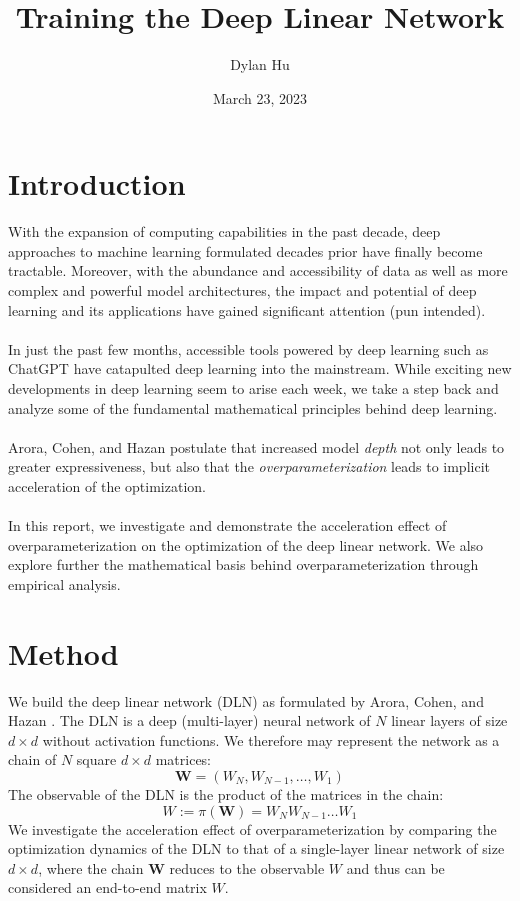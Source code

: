 \documentclass[11pt]{article}
\title{Training the Deep Linear Network}
\author{Dylan Hu}
\date{March 23, 2023}
\begin{document}
\maketitle
{
  \hypersetup{linkcolor=black}
  \tableofcontents
}
\section{Introduction}
With the expansion of computing capabilities in the past decade, deep approaches to machine learning formulated decades prior have finally become tractable. Moreover, with the abundance and accessibility of data as well as more complex and powerful model architectures, the impact and potential of deep learning and its applications have gained significant attention (pun intended).
\\\\
In just the past few months, accessible tools powered by deep learning such as ChatGPT have catapulted deep learning into the mainstream. While exciting new developments in deep learning seem to arise each week, we take a step back and analyze some of the fundamental mathematical principles behind deep learning.
\\\\
Arora, Cohen, and Hazan \cite{arora2018optimization} postulate that increased model \textit{depth} not only leads to greater expressiveness, but also that the \textit{overparameterization} leads to implicit acceleration of the optimization.
\\\\
In this report, we investigate and demonstrate the acceleration effect of overparameterization on the optimization of the deep linear network. We also explore further the mathematical basis behind overparameterization through empirical analysis.

\pagebreak

\section{Method}
We build the deep linear network (DLN) as formulated by Arora, Cohen, and Hazan \cite{arora2018optimization}. The DLN is a deep (multi-layer) neural network of $N$ linear layers of size $d \times d$ without activation functions. We therefore may represent the network as a chain of $N$ square $d \times d$ matrices:
$$\bm{W} = \left(W_N, W_{N-1}, \hdots, W_1\right)$$
The observable of the DLN is the product of the matrices in the chain:
$$W := \pi\left(\bm{W}\right) = W_N W_{N-1} \hdots W_1$$
We investigate the acceleration effect of overparameterization by comparing the optimization dynamics of the DLN to that of a single-layer linear network of size $d \times d$, where the chain $\bm{W}$ reduces to the observable $W$ and thus can be considered an end-to-end matrix $W$.
\end{document}
